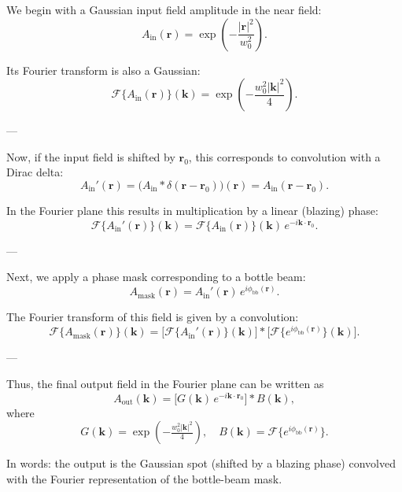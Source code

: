 \documentclass{article}
\begin{document}
We begin with a Gaussian input field amplitude in the near field:
\begin{equation}
    A_{\text{in}}(\mathbf{r}) = \exp\!\left(-\frac{|\mathbf{r}|^{2}}{w_{0}^{2}}\right).
\end{equation}

Its Fourier transform is also a Gaussian:
\begin{equation}
    \mathcal{F}\{A_{\text{in}}(\mathbf{r})\}(\mathbf{k}) 
    = \exp\!\left(-\frac{w_{0}^{2}|\mathbf{k}|^{2}}{4}\right).
\end{equation}

---

Now, if the input field is shifted by $\mathbf{r}_{0}$, this corresponds to convolution with a Dirac delta:
\begin{equation}
    A_{\text{in}}'(\mathbf{r}) 
    = \big( A_{\text{in}} \ast \delta(\mathbf{r}-\mathbf{r}_{0}) \big)(\mathbf{r})
    = A_{\text{in}}(\mathbf{r}-\mathbf{r}_{0}).
\end{equation}

In the Fourier plane this results in multiplication by a linear (blazing) phase:
\begin{equation}
    \mathcal{F}\{A_{\text{in}}'(\mathbf{r})\}(\mathbf{k})
    = \mathcal{F}\{A_{\text{in}}(\mathbf{r})\}(\mathbf{k}) \,
      e^{-i \mathbf{k}\cdot \mathbf{r}_{0}}.
\end{equation}

---

Next, we apply a phase mask corresponding to a bottle beam:
\begin{equation}
    A_{\text{mask}}(\mathbf{r}) 
    = A_{\text{in}}'(\mathbf{r}) \, e^{i \phi_{\text{bb}}(\mathbf{r})}.
\end{equation}

The Fourier transform of this field is given by a convolution:
\begin{equation}
    \mathcal{F}\{A_{\text{mask}}(\mathbf{r})\}(\mathbf{k})
    = \bigg[ \mathcal{F}\{A_{\text{in}}'(\mathbf{r})\}(\mathbf{k}) \bigg]
      \ast \bigg[ \mathcal{F}\{e^{i \phi_{\text{bb}}(\mathbf{r})}\}(\mathbf{k}) \bigg].
\end{equation}

---

Thus, the final output field in the Fourier plane can be written as
\begin{equation}
    A_{\text{out}}(\mathbf{k}) 
    = \Big[ G(\mathbf{k}) \, e^{-i \mathbf{k}\cdot \mathbf{r}_{0}} \Big]
      \ast B(\mathbf{k}),
\end{equation}
where 
\[
    G(\mathbf{k}) = \exp\!\left(-\tfrac{w_{0}^{2}|\mathbf{k}|^{2}}{4}\right), 
    \quad 
    B(\mathbf{k}) = \mathcal{F}\{ e^{i \phi_{\text{bb}}(\mathbf{r})} \}.
\]

In words: the output is the Gaussian spot (shifted by a blazing phase) convolved with the Fourier representation of the bottle-beam mask.
\end{document}
